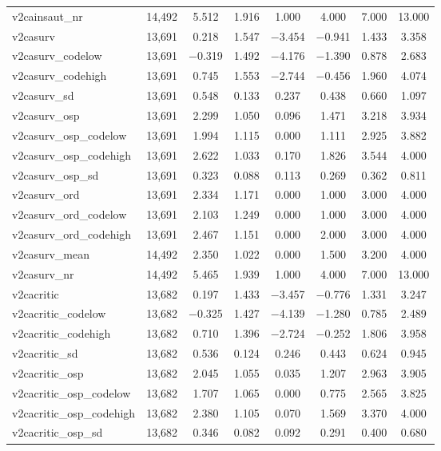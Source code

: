 \begin{table}[!htbp]
\begin{tabular}{@{\extracolsep{5pt}}lccccccc}
v2cainsaut\_nr & 14,492 & 5.512 & 1.916 & 1.000 & 4.000 & 7.000 & 13.000 \\ 
v2casurv & 13,691 & 0.218 & 1.547 & $-$3.454 & $-$0.941 & 1.433 & 3.358 \\ 
v2casurv\_codelow & 13,691 & $-$0.319 & 1.492 & $-$4.176 & $-$1.390 & 0.878 & 2.683 \\ 
v2casurv\_codehigh & 13,691 & 0.745 & 1.553 & $-$2.744 & $-$0.456 & 1.960 & 4.074 \\ 
v2casurv\_sd & 13,691 & 0.548 & 0.133 & 0.237 & 0.438 & 0.660 & 1.097 \\ 
v2casurv\_osp & 13,691 & 2.299 & 1.050 & 0.096 & 1.471 & 3.218 & 3.934 \\ 
v2casurv\_osp\_codelow & 13,691 & 1.994 & 1.115 & 0.000 & 1.111 & 2.925 & 3.882 \\ 
v2casurv\_osp\_codehigh & 13,691 & 2.622 & 1.033 & 0.170 & 1.826 & 3.544 & 4.000 \\ 
v2casurv\_osp\_sd & 13,691 & 0.323 & 0.088 & 0.113 & 0.269 & 0.362 & 0.811 \\ 
v2casurv\_ord & 13,691 & 2.334 & 1.171 & 0.000 & 1.000 & 3.000 & 4.000 \\ 
v2casurv\_ord\_codelow & 13,691 & 2.103 & 1.249 & 0.000 & 1.000 & 3.000 & 4.000 \\ 
v2casurv\_ord\_codehigh & 13,691 & 2.467 & 1.151 & 0.000 & 2.000 & 3.000 & 4.000 \\ 
v2casurv\_mean & 14,492 & 2.350 & 1.022 & 0.000 & 1.500 & 3.200 & 4.000 \\ 
v2casurv\_nr & 14,492 & 5.465 & 1.939 & 1.000 & 4.000 & 7.000 & 13.000 \\ 
v2cacritic & 13,682 & 0.197 & 1.433 & $-$3.457 & $-$0.776 & 1.331 & 3.247 \\ 
v2cacritic\_codelow & 13,682 & $-$0.325 & 1.427 & $-$4.139 & $-$1.280 & 0.785 & 2.489 \\ 
v2cacritic\_codehigh & 13,682 & 0.710 & 1.396 & $-$2.724 & $-$0.252 & 1.806 & 3.958 \\ 
v2cacritic\_sd & 13,682 & 0.536 & 0.124 & 0.246 & 0.443 & 0.624 & 0.945 \\ 
v2cacritic\_osp & 13,682 & 2.045 & 1.055 & 0.035 & 1.207 & 2.963 & 3.905 \\ 
v2cacritic\_osp\_codelow & 13,682 & 1.707 & 1.065 & 0.000 & 0.775 & 2.565 & 3.825 \\ 
v2cacritic\_osp\_codehigh & 13,682 & 2.380 & 1.105 & 0.070 & 1.569 & 3.370 & 4.000 \\ 
v2cacritic\_osp\_sd & 13,682 & 0.346 & 0.082 & 0.092 & 0.291 & 0.400 & 0.680 \\ 

\end{tabular}
\end{table}
